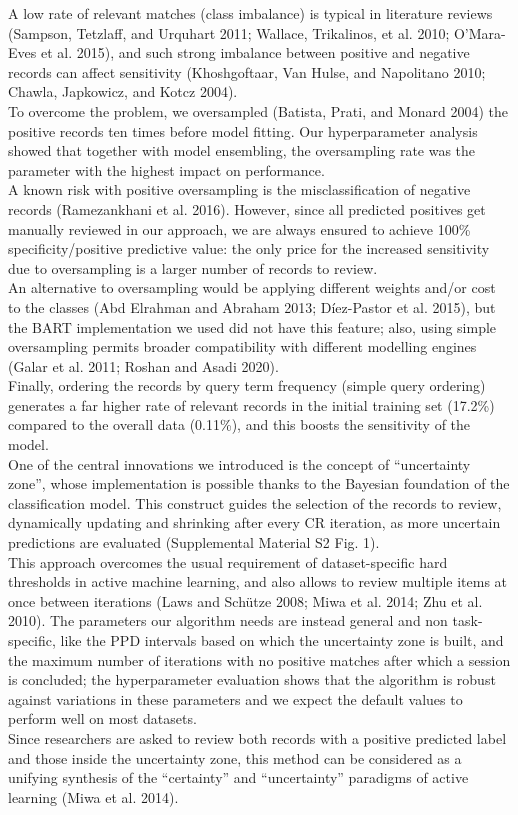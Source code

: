 \documentclass{article}
\begin{document}
A low rate of relevant matches (class imbalance) is typical in
literature reviews (Sampson, Tetzlaff, and Urquhart 2011; Wallace,
Trikalinos, et al. 2010; O'Mara-Eves et al. 2015), and such strong
imbalance between positive and negative records can affect sensitivity
(Khoshgoftaar, Van Hulse, and Napolitano 2010; Chawla, Japkowicz, and
Kotcz 2004).\\
To overcome the problem, we oversampled (Batista, Prati, and Monard
2004) the positive records ten times before model fitting. Our
hyperparameter analysis showed that together with model ensembling, the
oversampling rate was the parameter with the highest impact on
performance.\\
A known risk with positive oversampling is the misclassification of
negative records (Ramezankhani et al. 2016). However, since all
predicted positives get manually reviewed in our approach, we are always
ensured to achieve 100\% specificity/positive predictive value: the only
price for the increased sensitivity due to oversampling is a larger
number of records to review.\\
An alternative to oversampling would be applying different weights
and/or cost to the classes (Abd Elrahman and Abraham 2013; Díez-Pastor
et al. 2015), but the BART implementation we used did not have this
feature; also, using simple oversampling permits broader compatibility
with different modelling engines (Galar et al. 2011; Roshan and Asadi
2020).\\
Finally, ordering the records by query term frequency (simple query
ordering) generates a far higher rate of relevant records in the initial
training set (17.2\%) compared to the overall data (0.11\%), and this
boosts the sensitivity of the model.\\

One of the central innovations we introduced is the concept of
``uncertainty zone'', whose implementation is possible thanks to the
Bayesian foundation of the classification model. This construct guides
the selection of the records to review, dynamically updating and
shrinking after every CR iteration, as more uncertain predictions are
evaluated (Supplemental Material S2 Fig. 1).\\
This approach overcomes the usual requirement of dataset-specific hard
thresholds in active machine learning, and also allows to review
multiple items at once between iterations (Laws and Schütze 2008; Miwa
et al. 2014; Zhu et al. 2010). The parameters our algorithm needs are
instead general and non task-specific, like the PPD intervals based on
which the uncertainty zone is built, and the maximum number of
iterations with no positive matches after which a session is concluded;
the hyperparameter evaluation shows that the algorithm is robust against
variations in these parameters and we expect the default values to
perform well on most datasets.\\
Since researchers are asked to review both records with a positive
predicted label and those inside the uncertainty zone, this method can
be considered as a unifying synthesis of the ``certainty'' and
``uncertainty'' paradigms of active learning (Miwa et al. 2014).\\
\end{document}
